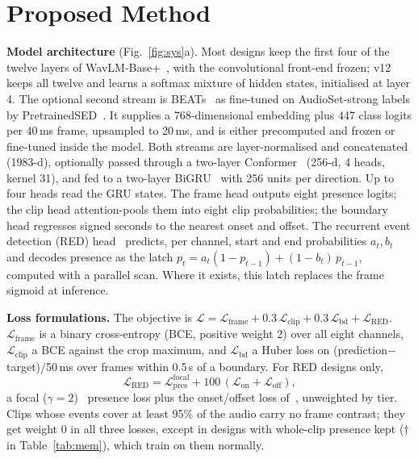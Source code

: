\documentclass[conference,10pt]{IEEEtran}
\begin{document}
\section{Proposed Method}
\textbf{Model architecture} (Fig.~\ref{fig:sys}a). Most designs keep the first four of the twelve layers of WavLM-Base+~\cite{wavlm}, with the convolutional front-end frozen; v12 keeps all twelve and learns a softmax mixture of hidden states, initialised at layer 4. The optional second stream is BEATs~\cite{beats} as fine-tuned on AudioSet-strong labels by PretrainedSED~\cite{schmid2025}. It supplies a 768-dimensional embedding plus 447 class logits per 40\,ms frame, upsampled to 20\,ms, and is either precomputed and frozen or fine-tuned inside the model. Both streams are layer-normalised and concatenated (1983-d), optionally passed through a two-layer Conformer~\cite{conformer} (256-d, 4 heads, kernel 31), and fed to a two-layer BiGRU~\cite{gru} with 256 units per direction. Up to four heads read the GRU states. The frame head outputs eight presence logits; the clip head attention-pools them into eight clip probabilities; the boundary head regresses signed seconds to the nearest onset and offset. The recurrent event detection (RED) head~\cite{schmid2026red} predicts, per channel, start and end probabilities $a_t,b_t$ and decodes presence as the latch $p_t=a_t(1-p_{t-1})+(1-b_t)\,p_{t-1}$, computed with a parallel scan. Where it exists, this latch replaces the frame sigmoid at inference.

\textbf{Loss formulations.} The objective is $\mathcal{L}=\mathcal{L}_\text{frame}+0.3\,\mathcal{L}_\text{clip}+0.3\,\mathcal{L}_\text{bd}+\mathcal{L}_\text{RED}$. $\mathcal{L}_\text{frame}$ is a binary cross-entropy (BCE, positive weight 2) over all eight channels, $\mathcal{L}_\text{clip}$ a BCE against the crop maximum, and $\mathcal{L}_\text{bd}$ a Huber loss on (prediction$-$target)/50\,ms over frames within 0.5\,s of a boundary. For RED designs only,
\begin{equation}
\mathcal{L}_\text{RED}=\mathcal{L}^\text{focal}_\text{pres}+100\,(\mathcal{L}_\text{on}+\mathcal{L}_\text{off}),
\end{equation}
a focal ($\gamma\!=\!2$)~\cite{focal} presence loss plus the onset/offset loss of~\cite{schmid2026red}, unweighted by tier. Clips whose events cover at least 95\% of the audio carry no frame contrast; they get weight 0 in all three losses, except in designs with whole-clip presence kept ($\dagger$ in Table~\ref{tab:mem}), which train on them normally.
\end{document}
